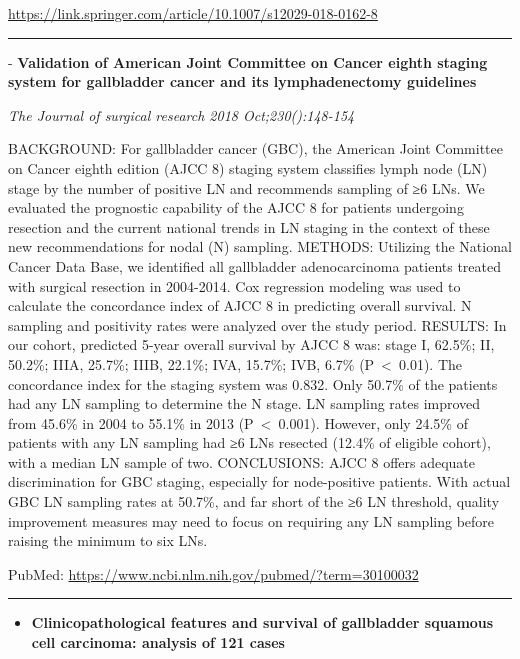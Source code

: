 \documentclass[]{article}
\providecommand{\tightlist}{%
  \setlength{\itemsep}{0pt}\setlength{\parskip}{0pt}}
\begin{document}
\url{https://link.springer.com/article/10.1007/s12029-018-0162-8}

\begin{center}\rule{0.5\linewidth}{\linethickness}\end{center}

 - \textbf{Validation of American Joint Committee on Cancer eighth
staging system for gallbladder cancer and its lymphadenectomy
guidelines}

\emph{The Journal of surgical research 2018 Oct;230():148-154}

BACKGROUND: For gallbladder cancer (GBC), the American Joint Committee
on Cancer eighth edition (AJCC 8) staging system classifies lymph node
(LN) stage by the number of positive LN and recommends sampling of ≥6
LNs. We evaluated the prognostic capability of the AJCC 8 for patients
undergoing resection and the current national trends in LN staging in
the context of these new recommendations for nodal (N) sampling.
METHODS: Utilizing the National Cancer Data Base, we identified all
gallbladder adenocarcinoma patients treated with surgical resection in
2004-2014. Cox regression modeling was used to calculate the concordance
index of AJCC 8 in predicting overall survival. N sampling and
positivity rates were analyzed over the study period. RESULTS: In our
cohort, predicted 5-year overall survival by AJCC 8 was: stage I,
62.5\%; II, 50.2\%; IIIA, 25.7\%; IIIB, 22.1\%; IVA, 15.7\%; IVB, 6.7\%
(P~\textless{}~0.01). The concordance index for the staging system was
0.832. Only 50.7\% of the patients had any LN sampling to determine the
N stage. LN sampling rates improved from 45.6\% in 2004 to 55.1\% in
2013 (P~\textless{}~0.001). However, only 24.5\% of patients with any LN
sampling had ≥6 LNs resected (12.4\% of eligible cohort), with a median
LN sample of two. CONCLUSIONS: AJCC 8 offers adequate discrimination for
GBC staging, especially for node-positive patients. With actual GBC LN
sampling rates at 50.7\%, and far short of the ≥6 LN threshold, quality
improvement measures may need to focus on requiring any LN sampling
before raising the minimum to six LNs.

PubMed: \url{https://www.ncbi.nlm.nih.gov/pubmed/?term=30100032}

{}

{}

\begin{center}\rule{0.5\linewidth}{\linethickness}\end{center}

\begin{itemize}
\tightlist
\item
  \textbf{Clinicopathological features and survival of gallbladder
  squamous cell carcinoma: analysis of 121 cases}
\end{itemize}
\end{document}
